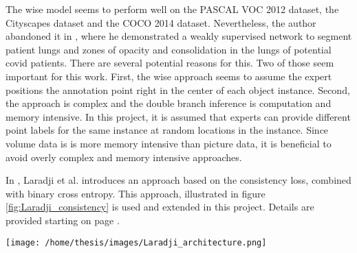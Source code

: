 \par{
    The \Gls{wise} model seems to perform well on the PASCAL VOC 2012 dataset, the Cityscapes dataset and the COCO 2014 dataset. 
    Nevertheless, the author abandoned it in \cite{Laradji2020}, where he demonstrated a weakly supervised network to segment patient lungs and zones of opacity and consolidation in the lungs of potential \Gls{covid} patients.
    There are several potential reasons for this. 
    Two of those seem important for this work. 
    First, the \Gls{wise} approach seems to assume the expert positions the annotation point right in the center of each object instance.
    Second, the approach is complex and the double branch inference is computation and memory intensive. 
    In this project, it is assumed that experts can provide different point labels for the same instance at random locations in the instance.
    Since volume data is is more memory intensive than picture data, it is beneficial to avoid overly complex and memory intensive approaches.
}
\par{
    In \cite{Laradji2020}, Laradji et al. introduces an approach based on the consistency loss, combined with binary cross entropy.
    This approach, illustrated in figure \ref{fig:Laradji_consistency} is used and extended in this project.
    Details are provided starting on page \pageref{sec:model_concept}.
}
\begin{SCfigure}[][htb]
    \texttt{[image: /home/thesis/images/Laradji\_architecture.png]}
    \caption{Illustration from \cite{Laradji2020}. The consistency loss approach is based on the combination of two loss terms: the unsupervised consistency loss and the (weakly) supervised point (cross entropy) loss.}
    \label{fig:Laradji_consistency}
\end{SCfigure}